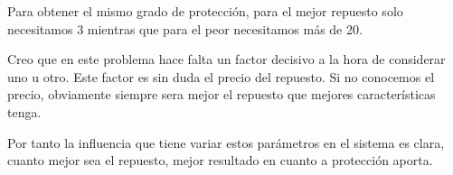 Para obtener el mismo grado de protección, para el mejor repuesto solo necesitamos 3 mientras que para el peor necesitamos más de 20.

Creo que en este problema hace falta un factor decisivo a la hora de considerar uno u otro. Este factor es sin duda el precio del repuesto. Si no conocemos el precio, obviamente siempre sera mejor el repuesto que mejores características tenga.

Por tanto la influencia que tiene variar estos parámetros en el sistema es clara, cuanto mejor sea el repuesto, mejor resultado en cuanto a protección aporta.
